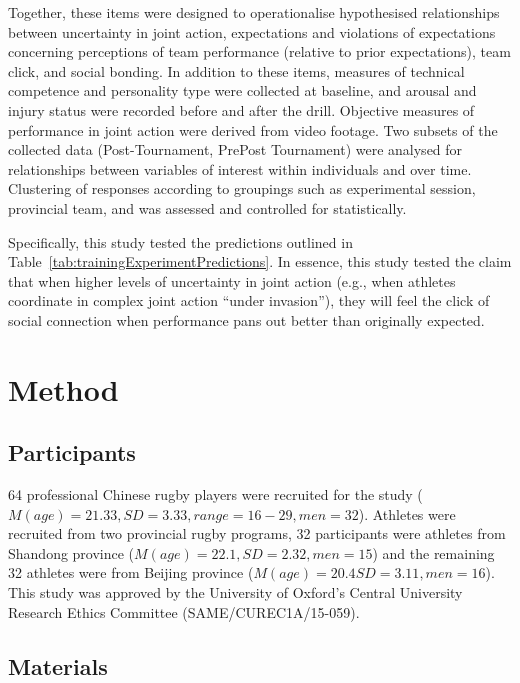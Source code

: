 \begin{CJK}{UTF8}{gbsn}
Together, these items were designed to operationalise hypothesised relationships between uncertainty in joint action, expectations and violations of expectations concerning perceptions of team performance (relative to prior expectations), team click, and social bonding.  In addition to these items, measures of technical competence and personality type were collected at baseline, and arousal and injury status were recorded before and after the drill.  Objective measures of performance in joint action were derived from video footage.  Two subsets of the collected data (Post-Tournament, PrePost Tournament) were analysed for relationships between variables of interest within individuals and over time.  Clustering of responses according to groupings such as experimental session, provincial team, and was assessed and controlled for statistically.

Specifically, this study tested the predictions outlined in Table~\ref{tab:trainingExperimentPredictions}.  In essence, this study tested the claim that when higher levels of uncertainty in joint action (e.g., when athletes coordinate in complex joint action ``under invasion''), they will feel the click of social connection when performance pans out better than originally expected.







\clearpage
\section{Method}

\subsection{Participants}
64 professional Chinese rugby players were recruited for the study ($M(age) = 21.33, SD = 3.33, range = 16-29, men = 32$).  Athletes were recruited from two provincial rugby programs, 32
participants were athletes from Shandong province ($M(age) = 22.1, SD = 2.32, men = 15$) and the remaining 32 athletes were from Beijing province ($M(age) = 20.4 SD = 3.11, men = 16$).  This study was approved by the University of Oxford's Central University Research Ethics Committee (SAME/CUREC1A/15-059).


\subsection{Materials}



\end{CJK}
